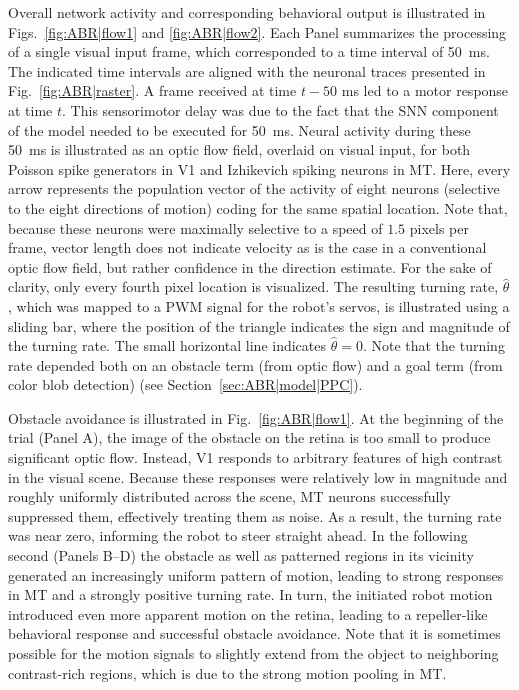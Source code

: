 Overall network activity and corresponding behavioral output
is illustrated in Figs.~\ref{fig:ABR|flow1} and \ref{fig:ABR|flow2}. 
Each Panel summarizes the processing
of a single visual input frame, which corresponded to a time
interval of \SI{50}{\milli\second}. 
The indicated time intervals are aligned with
the neuronal traces presented in Fig.~\ref{fig:ABR|raster}. 
A frame received at time $t-50$ ms led to a motor response at time $t$. 
This sensorimotor
delay was due to the fact that the \ac{SNN} component of the model
needed to be executed for \SI{50}{\milli\second}. 
Neural activity during these \SI{50}{\milli\second} is illustrated
as an optic flow field, overlaid on visual input,
for both Poisson spike generators in \ac{V1} and Izhikevich spiking
neurons in \ac{MT}. Here, every arrow represents the population vector
of the activity of eight neurons (selective to the eight directions of
motion) coding for the same spatial location. Note that, because
these neurons were maximally selective to a speed of $1.5$ pixels
per frame, vector length does not indicate velocity as is the case in a
conventional optic flow field, but rather confidence in the direction
estimate. For the sake of clarity, only every fourth pixel location is
visualized. The resulting turning rate, $\hat{\theta}$, 
which was mapped to a PWM signal for the robot's servos, 
is illustrated using a sliding bar,
where the position of the triangle indicates the sign and magnitude
of the turning rate. The small horizontal line indicates $\hat{\theta}=0$.
Note that the turning rate depended both on an obstacle term
(from optic flow) and a goal term (from color blob detection) (see
Section~\ref{sec:ABR|model|PPC}).

Obstacle avoidance is illustrated in Fig.~\ref{fig:ABR|flow1}. 
At the beginning of
the trial (Panel A), the image of the obstacle on the retina is too
small to produce significant optic flow. Instead, \ac{V1} responds to
arbitrary features of high contrast in the visual scene. Because
these responses were relatively low in magnitude and roughly
uniformly distributed across the scene, \ac{MT} neurons successfully
suppressed them, effectively treating them as noise. As a result, the
turning rate was near zero, informing the robot to steer straight
ahead. In the following second (Panels B--D) the obstacle as well as
patterned regions in its vicinity generated an increasingly uniform
pattern of motion, leading to strong responses in MT and a strongly
positive turning rate. In turn, the initiated robot motion introduced
even more apparent motion on the retina, leading to a repeller-like
behavioral response and successful obstacle avoidance. Note that
it is sometimes possible for the motion signals to slightly extend
from the object to neighboring contrast-rich regions, which is due
to the strong motion pooling in \ac{MT}.

